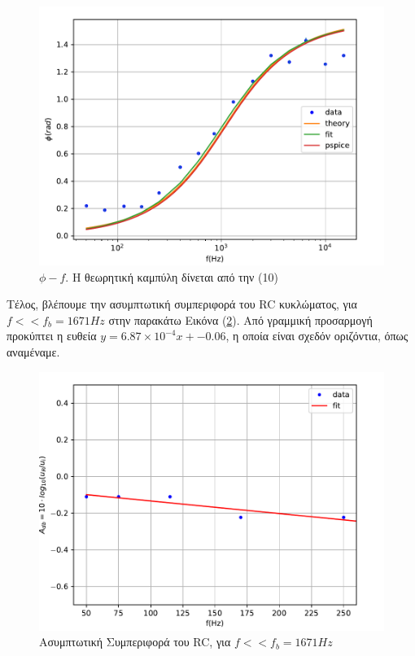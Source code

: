 \documentclass[a4paper]{article}
\begin{document}
		\begin{figure}[h!]
			\centering 
			\includegraphics[scale=0.7]{../plots/RC_f-phi.pdf}
			\caption{$\phi - f$. Η θεωρητική καμπύλη δίνεται από την (10)}
			\label{fig13}
		\end{figure}	
		
		Τέλος, βλέπουμε την ασυμπτωτική συμπεριφορά του RC κυκλώματος, για $f << f_b = 1671Hz$ στην παρακάτω Εικόνα (\ref{fig14}). Από γραμμική προσαρμογή προκύπτει η ευθεία $y= 6.87\times10^{-4} x + -0.06$, η οποία είναι σχεδόν οριζόντια, όπως αναμέναμε.
	
		\begin{figure}[h!]
			\centering 
			\includegraphics[scale=0.7]{../plots/RC_f-Adb-linear.pdf}
			\caption{Ασυμπτωτική Συμπεριφορά του RC, για $f << f_b = 1671Hz$}
			\label{fig14}
		\end{figure}	
		
\end{document}
